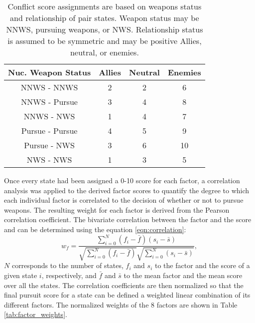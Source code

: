 \begin{table}
\centering
\begin{tabular}{||c|c|c|c|}
\hline
\textbf{Nuc. Weapon Status} & \textbf{Allies}  & \textbf{Neutral}  & \textbf{Enemies} \\
\hline
\hline
NNWS - NNWS     & 2 & 2 & 6 \\
\hline
NNWS - Pursue   & 3 & 4 & 8 \\
\hline
NNWS - NWS      & 1 & 4 & 7 \\
\hline
Pursue - Pursue & 4 & 5 & 9 \\
\hline
Pursue - NWS    & 3 & 6 & 10 \\
\hline
NWS - NWS       & 1 & 3 & 5 \\
\hline
\end{tabular}
\caption{Conflict score assignments are based on weapons status and relationship of pair states. Weapon status may be \gls{NNWS}, pursuing weapons, or \gls{NWS}. Relationship status is assumed to be symmetric and  may be positive Allies, neutral, or enemies.}
\label{tab:conflict}
\end{table}

Once every state had been assigned a 0-10 score for each factor, a correlation
analysis was applied to the derived factor scores to quantify the degree to
which each individual factor is correlated to the decision of whether or not to
pursue weapons. The resulting weight for each factor is derived from the Pearson correlation coefficient. The bivariate correlation between the factor and the score and can be determined using the equation \ref{eqn:correlation}:
\begin{equation}
    \label{eqn:correlation}
    w_{f} = \frac{\sum_{i=0}^{N} (f_{i} - \bar{f}) (s_{i} - \bar{s})}
                 {\sqrt{\sum_{i=0}^{N}\left(f_{i} - \bar{f}\right)}
                 \sqrt{\sum_{i=0}^{N}\left(s_{i} - \bar{s}\right)}},
\end{equation}
$N$ corresponds to the number of states, $f_{i}$ and $s_{i}$ to the factor and the score of a given state $i$, respectively,  and $\bar{f}$ and $\bar{s}$ to
the mean factor and the mean score over all the states.  The correlation coefficients are then normalized so that the final pursuit score for a state can be defined a weighted linear combination of its different factors. The normalized weights of the 8 factors are shown in Table \ref{tab:factor_weights}. 

